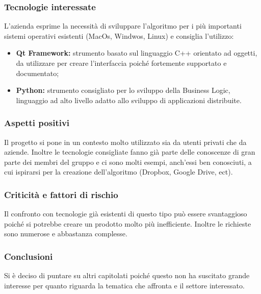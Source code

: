 \subsubsection{Tecnologie interessate}
L'azienda esprime la necessità di sviluppare l'algoritmo per i più importanti sistemi operativi esistenti (MacOs, Windwos, Linux) e consiglia l'utilizzo:
\begin{itemize}
\item \textbf{Qt Framework:} strumento basato sul linguaggio C++ orientato ad oggetti, da utilizzare per creare l'interfaccia poiché fortemente supportato e documentato;
\item \textbf{Python:} strumento consigliato per lo sviluppo della Business Logic, linguaggio ad alto livello adatto allo sviluppo di applicazioni distribuite.
\end{itemize}
\subsubsection{Aspetti positivi}
Il progetto si pone in un contesto molto utilizzato sia da utenti privati che da aziende. Inoltre le tecnologie consigliate fanno già parte delle conoscenze di gran parte dei membri del gruppo e ci sono molti esempi, anch'essi ben conosciuti, a cui ispirarsi per la creazione dell'algoritmo (Dropbox, Google Drive, ect).
\subsubsection{Criticità e fattori di rischio}
Il confronto con tecnologie già esistenti di questo tipo può essere svantaggioso poiché si potrebbe creare un prodotto molto più inefficiente. Inoltre le richieste sono numerose e abbastanza complesse.
\subsubsection{Conclusioni}
Si è deciso di puntare su altri capitolati poiché questo non ha suscitato grande interesse per quanto riguarda la tematica che affronta e il settore interessato.